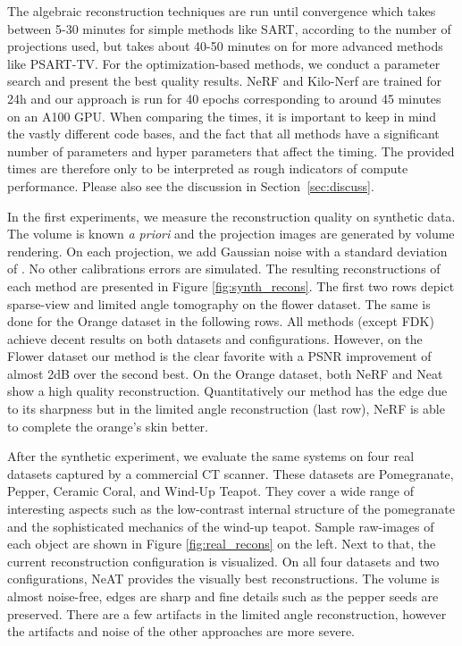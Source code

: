 \documentclass[acmtog,nonacm]{acmart} \acmSubmissionID{0438}
\begin{document}
The algebraic reconstruction techniques are run until convergence
which takes between 5-30 minutes for simple methods like SART, according to the number of projections used, but
takes about 40-50 minutes on for more advanced methods like
PSART-TV. For the optimization-based methods, we conduct a parameter
search and present the best quality results.
NeRF and Kilo-Nerf
are trained for 24h and our approach is run for 40 epochs
corresponding to around 45 minutes on an A100 GPU.  When comparing the
times, it is important to keep in mind the vastly different code
bases, and the fact that all methods have a significant number of
parameters and hyper parameters that affect the timing. The provided
times are therefore only to be interpreted as rough indicators of
compute performance. Please also see the discussion in
Section~\ref{sec:discuss}.

In the first experiments, we measure the reconstruction quality on synthetic data.
The volume is known \textit{a priori} and the projection images are generated by volume rendering.
On each projection, we add Gaussian noise with a standard deviation of .
No other calibrations errors are simulated.
The resulting reconstructions of each method are presented in Figure \ref{fig:synth_recons}.
The first two rows depict sparse-view and limited angle tomography on the flower dataset.
The same is done for the Orange dataset in the following rows.
All methods (except FDK) achieve decent results on both datasets and configurations.
However, on the Flower dataset our method is the clear favorite with a PSNR improvement of almost 2dB over the second best.
On the Orange dataset, both NeRF and Neat show a high quality reconstruction.
Quantitatively our method has the edge due to its sharpness but in the limited angle reconstruction (last row), NeRF is able to complete the orange's skin better.

After the synthetic experiment, we evaluate the same systems on four real datasets captured by a commercial CT scanner.
These datasets are Pomegranate, Pepper, Ceramic Coral, and Wind-Up Teapot.
They cover a wide range of interesting aspects such as the low-contrast internal structure of the pomegranate and the sophisticated mechanics of the wind-up teapot. 
Sample raw-images of each object are shown in Figure \ref{fig:real_recons} on the left.
Next to that, the current reconstruction configuration is visualized. 
On all four datasets and two configurations, NeAT provides the visually best reconstructions.
The volume is almost noise-free, edges are sharp and fine details such as the pepper seeds are preserved.
There are a few artifacts in the limited angle reconstruction, however the artifacts and noise of the other approaches are more severe. 
\end{document}
